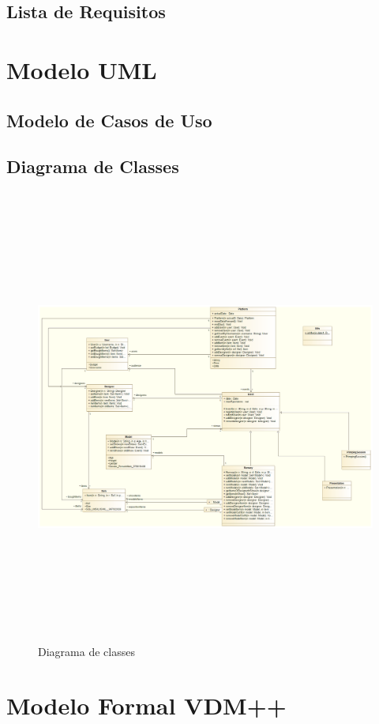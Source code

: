 \documentclass{article}
\begin{document}
\subsection{Lista de Requisitos}

\section{Modelo UML}
\subsection{Modelo de Casos de Uso}
\subsection{Diagrama de Classes}
\begin{figure}[H]
\centering
\includegraphics[width=160mm,height=150mm]{./images/class_diagram.png}
\caption{Diagrama de classes}
\label{fig:method}
\end{figure}
		
\section{Modelo Formal VDM++}
\end{document}
